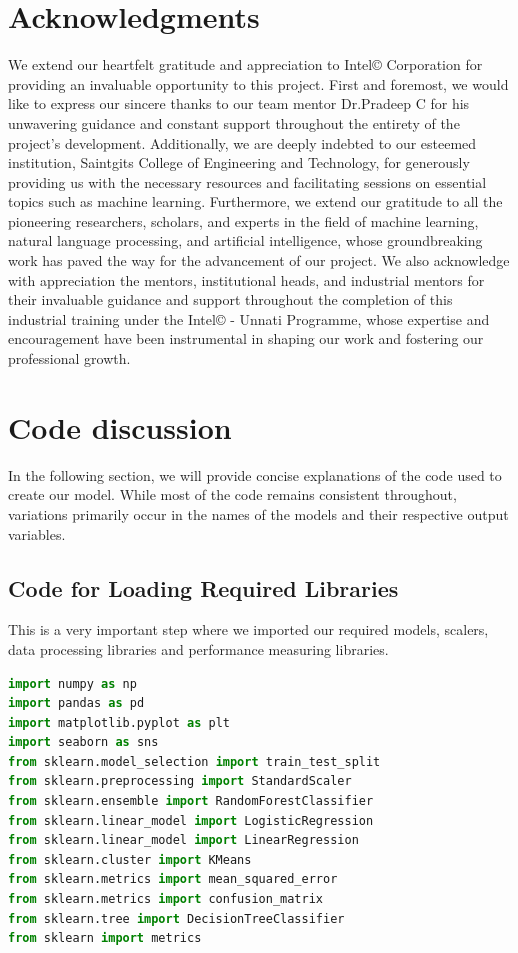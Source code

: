 \documentclass{article}
\begin{document}
\section{Acknowledgments}
We extend our heartfelt gratitude and appreciation to Intel© Corporation for providing an invaluable opportunity to this project. First and foremost, we would like to express our sincere thanks to our team mentor Dr.Pradeep C for his unwavering guidance and constant support throughout the entirety of the project's development. Additionally, we are deeply indebted to our esteemed institution, Saintgits College of Engineering and Technology, for generously providing us with the necessary resources and facilitating sessions on essential topics such as machine learning. Furthermore, we extend our gratitude to all the pioneering researchers, scholars, and experts in the field of machine learning, natural language processing, and artificial intelligence, whose groundbreaking work has paved the way for the advancement of our project. We also acknowledge with appreciation the mentors, institutional heads, and industrial mentors for their invaluable guidance and support throughout the completion of this industrial training under the Intel© - Unnati Programme, whose expertise and encouragement have been instrumental in shaping our work and fostering our professional growth.
\section{Code discussion}
In the following section, we will provide concise explanations of the code used to create our model. While most of the code remains consistent throughout, variations primarily occur in the names of the models and their respective output variables.

\subsection{Code for Loading Required Libraries}
This is a very important step where we imported our required models, scalers, data processing libraries and performance measuring libraries.
\begin{lstlisting}[language=Python, caption=Libraries used]
import numpy as np
import pandas as pd
import matplotlib.pyplot as plt
import seaborn as sns
from sklearn.model_selection import train_test_split 
from sklearn.preprocessing import StandardScaler
from sklearn.ensemble import RandomForestClassifier
from sklearn.linear_model import LogisticRegression
from sklearn.linear_model import LinearRegression
from sklearn.cluster import KMeans
from sklearn.metrics import mean_squared_error
from sklearn.metrics import confusion_matrix
from sklearn.tree import DecisionTreeClassifier
from sklearn import metrics
\end{lstlisting}
\end{document}
